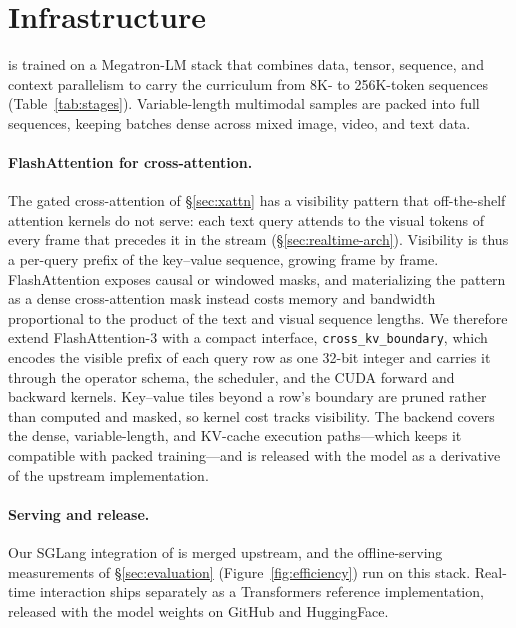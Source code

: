 \section{Infrastructure}\label{sec:infrastructure}

\mossvl{} is trained on a Megatron-LM stack \citep{Shoeybi2019megatron}
that combines data, tensor, sequence, and context parallelism to carry
the curriculum from 8K- to 256K-token sequences
(Table~\ref{tab:stages}). Variable-length multimodal samples are packed
into full sequences, keeping batches dense across mixed image, video,
and text data.

\paragraph{FlashAttention for cross-attention.}
The gated cross-attention of \S\ref{sec:xattn} has a visibility pattern
that off-the-shelf attention kernels do not serve: each text query
attends to the visual tokens of every frame that precedes it in the
stream (\S\ref{sec:realtime-arch}). Visibility is thus a per-query
prefix of the key--value sequence, growing frame by frame.
FlashAttention exposes causal or windowed masks, and materializing the
pattern as a dense cross-attention mask instead costs memory and
bandwidth proportional to the product of the text and visual sequence
lengths. We therefore extend FlashAttention-3
\citep{Shah2024flashattention} with a compact interface,
\texttt{cross\_kv\_boundary}, which encodes the visible prefix of each
query row as one 32-bit integer and carries it through the operator
schema, the scheduler, and the CUDA forward and backward kernels.
Key--value tiles beyond a row's boundary are pruned rather than
computed and masked, so kernel cost tracks visibility. The backend
covers the dense, variable-length, and KV-cache execution
paths---which keeps it compatible with packed training---and is
released with the model as a derivative of the upstream implementation.

\paragraph{Serving and release.}
Our SGLang \citep{Zheng2023sglang} integration of \mossvl{} is merged
upstream, and the offline-serving measurements of
\S\ref{sec:evaluation} (Figure~\ref{fig:efficiency}) run on this stack.
Real-time interaction ships separately as a Transformers reference
implementation, released with the model weights on GitHub and
HuggingFace.
